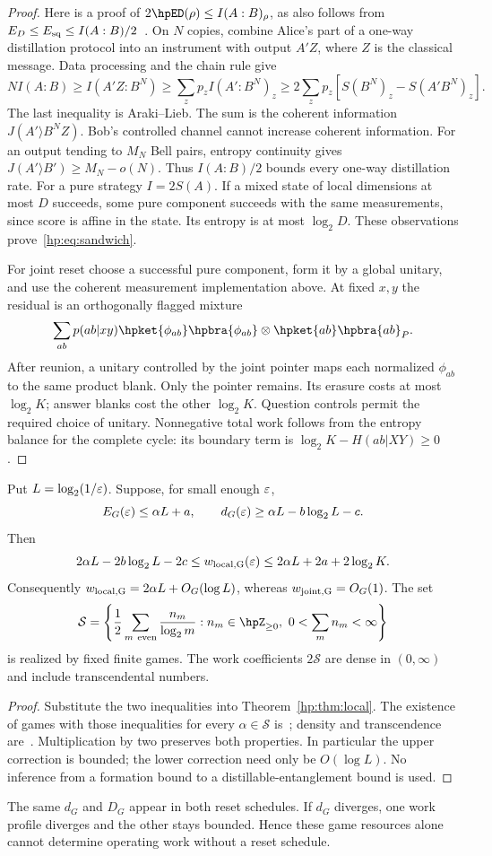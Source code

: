 \begin{proof}
Here is a proof of $2\hpED(\rho)\le I(A:B)_\rho$, as also follows from $E_D\le E_{\rm sq}\le I(A:B)/2$~\cite{ChristandlWinter04}. On $N$ copies, combine Alice's part of a one-way distillation protocol into an instrument with output $A'Z$, where $Z$ is the classical message. Data processing and the chain rule give
\[
 NI(A:B)\ge I(A'Z:B^N)\ge\sum_zp_z I(A':B^N)_z
 \ge2\sum_zp_z[S(B^N)_z-S(A'B^N)_z].
\]
The last inequality is Araki--Lieb. The sum is the coherent information $J(A'\rangle B^NZ)$. Bob's controlled channel cannot increase coherent information. For an output tending to $M_N$ Bell pairs, entropy continuity gives $J(A'\rangle B')\ge M_N-o(N)$. Thus $I(A:B)/2$ bounds every one-way distillation rate. For a pure strategy $I=2S(A)$. If a mixed state of local dimensions at most $D$ succeeds, some pure component succeeds with the same measurements, since score is affine in the state. Its entropy is at most $\log_2D$. These observations prove~\eqref{hp:eq:sandwich}.

For joint reset choose a successful pure component, form it by a global unitary, and use the coherent measurement implementation above. At fixed $x,y$ the residual is an orthogonally flagged mixture
\[
 \sum_{ab}p(ab|xy)\hpket{\phi_{ab}}\hpbra{\phi_{ab}}\otimes\hpket{ab}\hpbra{ab}_P.
\]
After reunion, a unitary controlled by the joint pointer maps each normalized $\phi_{ab}$ to the same product blank. Only the pointer remains. Its erasure costs at most $\log_2K$; answer blanks cost the other $\log_2K$. Question controls permit the required choice of unitary. Nonnegative total work follows from the entropy balance for the complete cycle: its boundary term is $\log_2K-H(ab|XY)\ge0$.
\end{proof}

\begin{corollary}\label{hp:cor:sharp}
Put $L=\log_2(1/\varepsilon)$. Suppose, for small enough $\varepsilon$,
\[
 E_G(\varepsilon)\le\alpha L+a,\qquad
 d_G(\varepsilon)\ge\alpha L-b\log_2L-c.
\]
Then
\begin{equation}
 2\alpha L-2b\log_2L-2c
 \le w_{\rm local,G}(\varepsilon)
 \le2\alpha L+2a+2\log_2K.\label{hp:eq:sharp}
\end{equation}
Consequently $w_{\rm local,G}=2\alpha L+O_G(\log L)$, whereas $w_{\rm joint,G}=O_G(1)$.
The set
\[
 \mathcal S=\left\{\frac12\sum_{m\ {\rm even}}\frac{n_m}{\log_2m}:
 n_m\in\hpZ_{\ge0},\ 0<\sum_m n_m<\infty\right\}
\]
is realized by fixed finite games. The work coefficients $2\mathcal S$ are dense in $(0,\infty)$ and include transcendental numbers.
\end{corollary}
\begin{proof}
Substitute the two inequalities into Theorem~\ref{hp:thm:local}. The existence of games with those inequalities for every $\alpha\in\mathcal S$ is~\cite[Theorem 11.9(a,b)]{HPprecision}; density and transcendence are~\cite[Corollary 11.11]{HPprecision}. Multiplication by two preserves both properties. In particular the upper correction is bounded; the lower correction need only be $O(\log L)$. No inference from a formation bound to a distillable-entanglement bound is used.
\end{proof}

The same $d_G$ and $D_G$ appear in both reset schedules. If $d_G$ diverges, one work profile diverges and the other stays bounded. Hence these game resources alone cannot determine operating work without a reset schedule.
